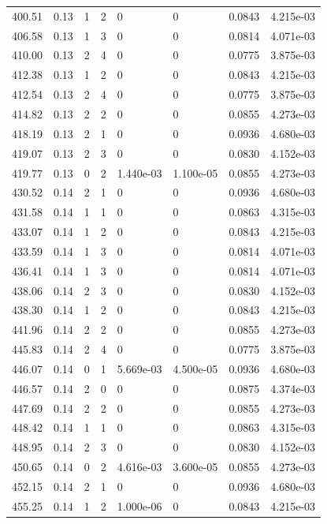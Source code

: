 \documentclass[preview]{standalone}
\begin{document}
{{{{{\begin{tabular}{L{1.2cm}C{1.2cm} C{0.3cm}C{0.5cm} C{1.4cm}C{1.4cm} C{1.4cm}C{1.4cm}}
  400.51  &  0.13  & 1     &  2 &  0  & 0  & 0.0843 &  4.215e-03   \\ 
  406.58  &  0.13  & 1     &  3 &  0  & 0  & 0.0814 &  4.071e-03   \\ 
  410.00  &  0.13  & 2     &  4 &  0  & 0  & 0.0775 &  3.875e-03   \\ 
  412.38  &  0.13  & 1     &  2 &  0  & 0  & 0.0843 &  4.215e-03   \\ 
  412.54  &  0.13  & 2     &  4 &  0  & 0  & 0.0775 &  3.875e-03   \\ 
  414.82  &  0.13  & 2     &  2 &  0  & 0  & 0.0855 &  4.273e-03   \\ 
  418.19  &  0.13  & 2     &  1 &  0  & 0  & 0.0936 &  4.680e-03   \\ 
  419.07  &  0.13  & 2     &  3 &  0  & 0  & 0.0830 &  4.152e-03   \\ 
  419.77  &  0.13  & 0     &  2 &  1.440e-03  & 1.100e-05  & 0.0855 &  4.273e-03   \\ 
  430.52  &  0.14  & 2     &  1 &  0  & 0  & 0.0936 &  4.680e-03   \\ 
  431.58  &  0.14  & 1     &  1 &  0  & 0  & 0.0863 &  4.315e-03   \\ 
  433.07  &  0.14  & 1     &  2 &  0  & 0  & 0.0843 &  4.215e-03   \\ 
  433.59  &  0.14  & 1     &  3 &  0  & 0  & 0.0814 &  4.071e-03   \\ 
  436.41  &  0.14  & 1     &  3 &  0  & 0  & 0.0814 &  4.071e-03   \\ 
  438.06  &  0.14  & 2     &  3 &  0  & 0  & 0.0830 &  4.152e-03   \\ 
  438.30  &  0.14  & 1     &  2 &  0  & 0  & 0.0843 &  4.215e-03   \\ 
  441.96  &  0.14  & 2     &  2 &  0  & 0  & 0.0855 &  4.273e-03   \\ 
  445.83  &  0.14  & 2     &  4 &  0  & 0  & 0.0775 &  3.875e-03   \\ 
  446.07  &  0.14  & 0     &  1 &  5.669e-03  & 4.500e-05  & 0.0936 &  4.680e-03   \\ 
  446.57  &  0.14  & 2     &  0 &  0  & 0  & 0.0875 &  4.374e-03   \\ 
  447.69  &  0.14  & 2     &  2 &  0  & 0  & 0.0855 &  4.273e-03   \\ 
  448.42  &  0.14  & 1     &  1 &  0  & 0  & 0.0863 &  4.315e-03   \\ 
  448.95  &  0.14  & 2     &  3 &  0  & 0  & 0.0830 &  4.152e-03   \\ 
  450.65  &  0.14  & 0     &  2 &  4.616e-03  & 3.600e-05  & 0.0855 &  4.273e-03   \\ 
  452.15  &  0.14  & 2     &  1 &  0  & 0  & 0.0936 &  4.680e-03   \\ 
  455.25  &  0.14  & 1     &  2 &  1.000e-06  & 0  & 0.0843 &  4.215e-03   \\ 
\hline 
\end{tabular} 

}}}}}
\end{document}
